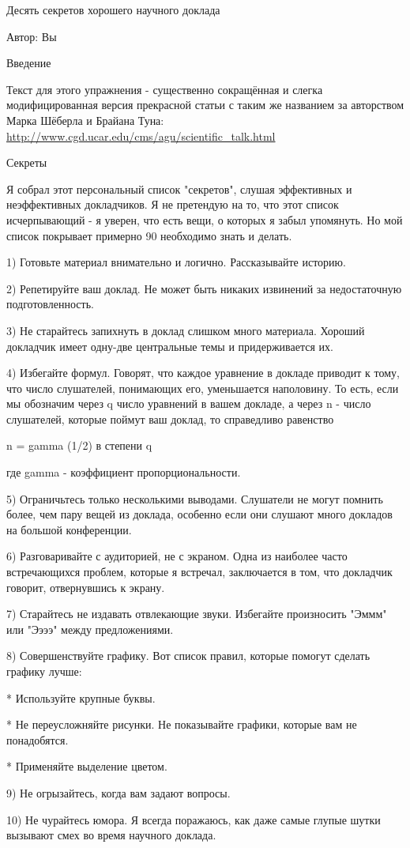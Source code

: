 \documentclass[12pt]{article}
\begin{document}
Десять секретов хорошего научного доклада

Автор: Вы

Введение

Текст для этого упражнения - существенно сокращённая и слегка модифицированная версия прекрасной статьи с таким же названием за
авторством Марка Шёберла и Брайана Туна:
\url{http://www.cgd.ucar.edu/cms/agu/scientific_talk.html}

Секреты

Я собрал этот персональный список "секретов", слушая эффективных и неэффективных докладчиков. Я не претендую на то, что этот
список исчерпывающий - я уверен, что есть вещи, о которых я забыл упомянуть. Но мой список покрывает примерно 90%
необходимо знать и делать.

1) Готовьте материал внимательно и логично. Рассказывайте историю.

2) Репетируйте ваш доклад. Не может быть никаких извинений за недостаточную подготовленность.

3) Не старайтесь запихнуть в доклад слишком много материала. Хороший докладчик имеет одну-две центральные темы и придерживается
их.

4) Избегайте формул. Говорят, что каждое уравнение в докладе приводит к тому, что число слушателей, понимающих его, уменьшается
наполовину. То есть, если мы обозначим через q число уравнений в вашем докладе, а через n - число слушателей, которые поймут ваш
доклад, то справедливо равенство

n = gamma (1/2) в степени q

где gamma - коэффициент пропорциональности.

5) Ограничьтесь только несколькими выводами. Слушатели не могут помнить более, чем пару вещей из доклада, особенно если они
слушают много докладов на большой конференции.

6) Разговаривайте с аудиторией, не с экраном. Одна из наиболее часто встречающихся проблем, которые я встречал, заключается в
том, что докладчик говорит, отвернувшись к экрану.

7) Старайтесь не издавать отвлекающие звуки. Избегайте произносить "Эммм" или "Ээээ" между предложениями.

8) Совершенствуйте графику. Вот список правил, которые помогут сделать графику лучше:

* Используйте крупные буквы.

* Не переусложняйте рисунки. Не показывайте графики, которые вам не понадобятся.

* Применяйте выделение цветом.

9) Не огрызайтесь, когда вам задают вопросы.

10) Не чурайтесь юмора. Я всегда поражаюсь, как даже самые глупые шутки вызывают смех во время научного доклада.
\end{document}
